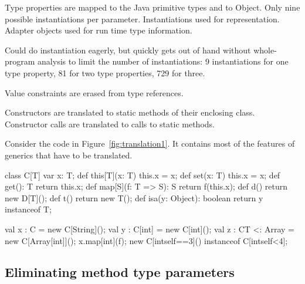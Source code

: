 \documentclass[preprint,nocopyrightspace,9pt]{sigplanconf}
\begin{document}
Type properties are mapped to the Java primitive types and to
Object.  Only nine possible instantiations per parameter.
Instantiations used for representation.
Adapter objects used for run time type information.

Could do instantiation eagerly, but quickly gets out of hand without
whole-program analysis to limit the number of instantiations: 9
instantiations for one type property, 81 for two type
properties, 729 for three.

Value constraints are erased from type references.

Constructors are translated to static methods of their enclosing
class.
Constructor calls
are translated to calls to static methods.


Consider the code in Figure~\ref{fig:translation1}.  It contains most of the
features of generics that have to be translated.
\begin{figure*}[tp]
\begin{xten}
class C[T] {
    var x: T;
    def this[T](x: T) { this.x = x; }
    def set(x: T) { this.x = x; }
    def get(): T { return this.x; }
    def map[S](f: T => S): S { return f(this.x); }
    def d() { return new D[T](); }
    def t() { return new T(); }
    def isa(y: Object): boolean { return y instanceof T; }
}

val x : C = new C[String]();
val y : C[int] = new C[int]();
val z : C{T <: Array} = new C[Array[int]]();
x.map[int](f);
new C[int{self==3}]() instanceof C[int{self<4}];
\end{xten}
\caption{Code to translate}
\label{fig:translation1}
\end{figure*}

\subsection{Eliminating method type parameters}

\begin{figure*}[tp]
\caption{After removing method parameters}
\label{fig:translation2}
\end{figure*}
\end{document}
